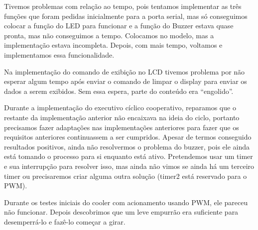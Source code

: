 \documentclass{article}
\begin{document}
Tivemos problemas com relação ao tempo, pois tentamos implementar as três funções que foram pedidas inicialmente para a porta serial, mas só conseguimos colocar a função do LED para funcionar e a função do Buzzer estava quase pronta, mas não conseguimos a tempo. Colocamos no modelo, mas a implementação estava incompleta. Depois, com mais tempo, voltamos e implementamos essa funcionalidade.

Na implementação do comando de exibição no LCD tivemos problema por não esperar algum tempo após enviar o comando de limpar o display para enviar os dados a serem exibidos. Sem essa espera, parte do conteúdo era ``engolido''.

Durante a implementação do executivo cíclico cooperativo, reparamos que o restante da implementação anterior não encaixava na ideia do ciclo, portanto precisamos fazer adaptações nas implementações anteriores para fazer que os requisitos anteriores continuassem a ser cumpridos. Apesar de termos conseguido resultados positivos, ainda não resolvermos o problema do buzzer, pois ele ainda está tomando o processo para si enquanto está ativo. Pretendemos usar um timer e sua interrupção para resolver isso, mas ainda não vimos se ainda há um terceiro timer ou precisaremos criar alguma outra solução (timer2 está reservado para o PWM).

Durante os testes iniciais do cooler com acionamento usando PWM, ele pareceu não funcionar. Depois descobrimos que um leve empurrão era suficiente para desemperrá-lo e fazê-lo começar a girar.

\begin{thebibliography}{widestlabel}

\end{thebibliography}
\end{document}
